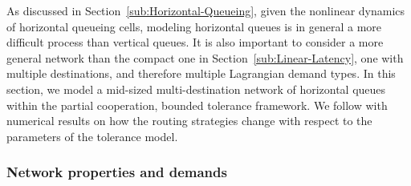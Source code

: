 As discussed in Section~\ref{sub:Horizontal-Queueing}, given the
nonlinear dynamics of horizontal queueing cells, modeling horizontal
queues is in general a more difficult process than vertical queues.
It is also important to consider a more general network than the compact
one in Section~\ref{sub:Linear-Latency}, one with multiple destinations,
and therefore multiple Lagrangian demand types. In this section, we
model a mid-sized multi-destination network of horizontal queues within
the partial cooperation, bounded tolerance framework. We follow with
numerical results on how the routing strategies change with respect
to the parameters of the tolerance model.


\subsubsection{Network properties and demands\label{sub:Network-properties-and}}

